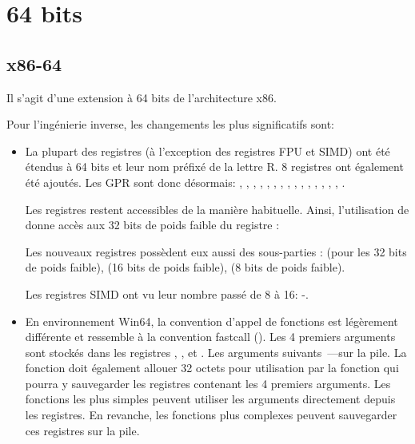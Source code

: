 \section{64 bits}

\subsection{x86-64}
\label{x86-64}

Il s'agit d'une extension à 64 bits de l'architecture x86.

Pour l'ingénierie inverse, les changements les plus significatifs sont:

\myindex{\CLanguageElements!\Pointers}
\begin{itemize}

\item

La plupart des registres (à l'exception des registres FPU et SIMD) ont été étendus à 64 bits et 
leur nom préfixé de la lettre R. 8 registres ont également été ajoutés.
Les \ac{GPR} sont donc désormais: \RAX, \RBX, \RCX, \RDX, 
\RBP, \RSP, \RSI, \RDI, , , , 
, , , , . 

Les  registres restent accessibles de la manière habituelle. Ainsi, l'utilisation de 
\EAX donne accès aux 32 bits de poids faible du registre \RAX:


Les nouveaux registres  possèdent eux aussi des sous-parties :  
(pour les 32 bits de poids faible),  (16 bits de poids faible),  
(8 bits de poids faible).


Les registres SIMD ont vu leur nombre passé de 8 à 16: -.

\item

En environnement Win64, la convention d'appel de fonctions est légèrement différente et ressemble 
à la convention fastcall ().
Les 4 premiers arguments sont stockés dans les registres \RCX, \RDX,  et . Les 
arguments suivants~---sur la pile.
La fonction  doit également allouer 32 octets pour utilisation par la fonction
 qui pourra y sauvegarder les registres contenant les 4 premiers arguments.
Les fonctions les plus simples peuvent utiliser les arguments directement depuis les registres. 
En revanche, les fonctions plus complexes peuvent sauvegarder ces registres sur la pile.


\end{itemize}
